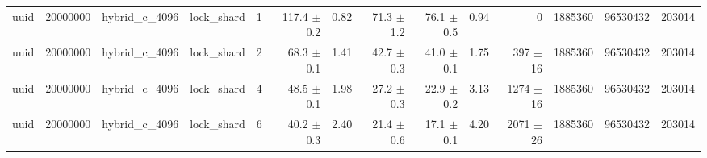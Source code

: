 \begin{tabular}{lllllrrrrrrrrr}
uuid & 20000000 & hybrid\_c\_4096 & lock\_shard & 1 & 117.4 $\pm$ 0.2 & 0.82 & 71.3 $\pm$ 1.2 & 76.1 $\pm$ 0.5 & 0.94 & 0 & 1885360 & 96530432 & 203014 \\
uuid & 20000000 & hybrid\_c\_4096 & lock\_shard & 2 & 68.3 $\pm$ 0.1 & 1.41 & 42.7 $\pm$ 0.3 & 41.0 $\pm$ 0.1 & 1.75 & 397 $\pm$ 16 & 1885360 & 96530432 & 203014 \\
uuid & 20000000 & hybrid\_c\_4096 & lock\_shard & 4 & 48.5 $\pm$ 0.1 & 1.98 & 27.2 $\pm$ 0.3 & 22.9 $\pm$ 0.2 & 3.13 & 1274 $\pm$ 16 & 1885360 & 96530432 & 203014 \\
uuid & 20000000 & hybrid\_c\_4096 & lock\_shard & 6 & 40.2 $\pm$ 0.3 & 2.40 & 21.4 $\pm$ 0.6 & 17.1 $\pm$ 0.1 & 4.20 & 2071 $\pm$ 26 & 1885360 & 96530432 & 203014 \\
\bottomrule
\end{tabular}
